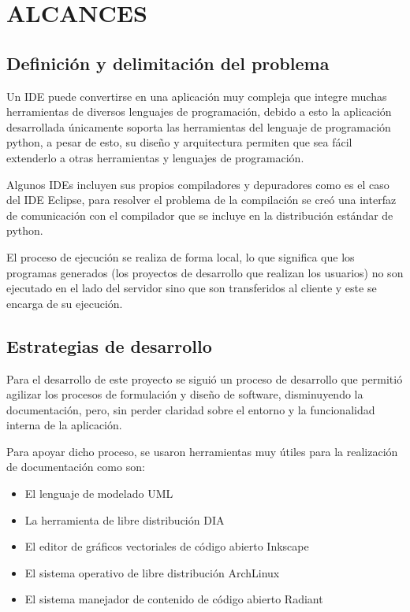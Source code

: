 ﻿\section{ALCANCES}

\subsection{Definición y delimitación del problema}

Un IDE puede convertirse en una aplicación muy compleja que integre muchas herramientas de diversos lenguajes de programación, debido a esto la aplicación desarrollada únicamente soporta las herramientas del lenguaje de programación python, a pesar de esto, su diseño y arquitectura permiten que sea fácil extenderlo a otras herramientas y lenguajes de programación.

Algunos IDEs incluyen sus propios compiladores y depuradores como es el caso del IDE Eclipse, para resolver el problema de la compilación se creó una interfaz de comunicación con el compilador que se incluye en la distribución estándar de python.

El proceso de ejecución se realiza de forma local, lo que significa que los programas generados (los proyectos de desarrollo que realizan los usuarios) no son ejecutado en el lado del servidor sino que son transferidos al cliente y este se encarga de su ejecución.

\subsection{Estrategias de desarrollo}

Para el desarrollo de este proyecto se siguió un proceso de desarrollo que permitió agilizar los procesos de formulación y diseño de software, disminuyendo la documentación, pero, sin perder claridad sobre el entorno y la funcionalidad interna de la aplicación.

Para apoyar dicho proceso, se usaron herramientas muy útiles para la realización de documentación como son:

\begin{itemize}
	\item El lenguaje de modelado UML \cite{uml}
	\item La herramienta de libre distribución DIA \cite{dia}
	\item El editor de gráficos vectoriales de código abierto Inkscape \cite{inkscape}
	\item El sistema operativo de libre distribución ArchLinux \cite{archlinux}
	\item El sistema manejador de contenido de código abierto Radiant \cite{radiant}
\end{itemize}